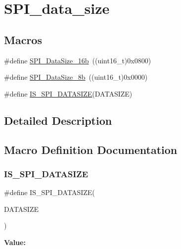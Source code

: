 \hypertarget{group___s_p_i__data__size}{}\section{S\+P\+I\+\_\+data\+\_\+size}
\label{group___s_p_i__data__size}
\subsection*{Macros}
\begin{DoxyCompactItemize}
\item 
\#define \mbox{\hyperlink{group___s_p_i__data__size_ga8af2c8ca5c2162423531ebf560e0a41d}{S\+P\+I\+\_\+\+Data\+Size\+\_\+16b}}~((uint16\+\_\+t)0x0800)
\item 
\#define \mbox{\hyperlink{group___s_p_i__data__size_ga56721814a935922b6ca7c49060509765}{S\+P\+I\+\_\+\+Data\+Size\+\_\+8b}}~((uint16\+\_\+t)0x0000)
\item 
\#define \mbox{\hyperlink{group___s_p_i__data__size_gab6f9f528f7eb70373b9caf3548e44e67}{I\+S\+\_\+\+S\+P\+I\+\_\+\+D\+A\+T\+A\+S\+I\+ZE}}(D\+A\+T\+A\+S\+I\+ZE)
\end{DoxyCompactItemize}


\subsection{Detailed Description}


\subsection{Macro Definition Documentation}
\mbox{\label{group___s_p_i__data__size_gab6f9f528f7eb70373b9caf3548e44e67}} 
\subsubsection{\texorpdfstring{IS\_SPI\_DATASIZE}{IS\_SPI\_DATASIZE}}
{\footnotesize\ttfamily \#define I\+S\+\_\+\+S\+P\+I\+\_\+\+D\+A\+T\+A\+S\+I\+ZE(\begin{DoxyParamCaption}\item[{}]{D\+A\+T\+A\+S\+I\+ZE }\end{DoxyParamCaption})}

{\bfseries Value\+:}
\begin{DoxyCode}{0}

\end{DoxyCode}
\mbox{\label{group___s_p_i__data__size_ga8af2c8ca5c2162423531ebf560e0a41d}} 
